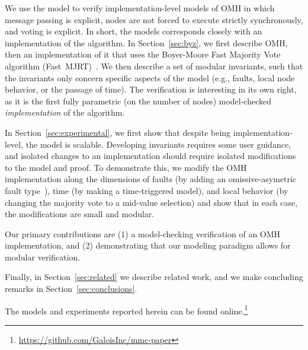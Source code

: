 \documentclass{llncs/llncs}
\newcommand{\OMH}{\ensuremath{\mathrm{OMH}}\xspace}
\begin{document}

We use the model to verify implementation-level models of $\OMH$ in which message passing is explicit, nodes are not forced to execute strictly synchronously, and voting is explicit. In short, the models corresponds closely with an implementation of the algorithm. In Section~\ref{sec:byz}, we first describe \OMH, then an implementation of it that uses the Boyer-Moore Fast Majority Vote algorithm (Fast~MJRT)~\cite{mjrty}. We then describe a set of modular invariants, such that the invariants only concern specific aspects of the model (e.g., faults, local node behavior, or the passage of time). The verification is interesting in its own right, as it is the first fully parametric (on the number of nodes) model-checked \emph{implementation} of the algorithm.

In Section~\ref{sec:experimental}, we first show that despite being implementation-level, the model is scalable. Developing invariants requires some user guidance, and isolated changes to an implementation should require isolated modifications to the model and proof. To demonstrate this, we modify the \OMH implementation along the dimensions of faults (by adding an omissive-asymetric fault type~\cite{omissive}), time (by making a time-triggered model), and local behavior (by changing the majority vote to a mid-value selection) and show that in each case, the modifications are small and modular.

Our primary contributions are (1) a model-checking verification of an $\OMH$ implementation, and (2) demonstrating that our modeling paradigm allows for modular verification.

Finally, in Section~\ref{sec:related} we describe related work, and we make concluding remarks in Section~\ref{sec:conclusions}.

The models and experiments reported herein can be found online.\footnote{\url{https://github.com/GaloisInc/mmc-paper}}

\end{document}
